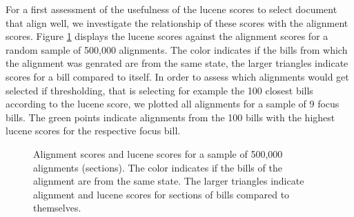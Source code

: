 \documentclass[12pt]{article} %
\begin{document}
For a first assessment of the usefulness of the lucene scores to select document that align well, we investigate the relationship of these scores with the alignment scores. Figure \ref{fig:lu_al_scores} displays the lucene scores against the alignment scores for a random sample of 500,000 alignments. The color indicates if the bills from which the alignment was genrated are from the same state, the larger triangles indicate scores for a bill compared to itself. In order to assess which alignments would get selected if thresholding, that is selecting for example the 100 closest bills according to the lucene score, we plotted all alignments for a sample of 9 focus bills. The green points indicate alignments from the 100 bills with the highest lucene scores for the respective focus bill.

\begin{figure}[ht!]
    \caption{Alignment scores and lucene scores for a sample of 500,000 alignments (sections). The color indicates if the bills of the alignment are from the same state. The larger triangles indicate alignment and lucene scores for sections of bills compared to themselves.}
\label{fig:lu_al_scores} 
\end{figure}
\end{document}
